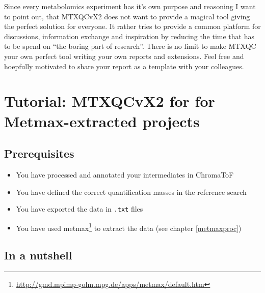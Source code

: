 \documentclass[]{book}
\providecommand{\tightlist}{%
  \setlength{\itemsep}{0pt}\setlength{\parskip}{0pt}}
\let\rmarkdownfootnote\footnote%
\def\footnote{\protect\rmarkdownfootnote}
\theoremstyle{definition}
\theoremstyle{definition}
\theoremstyle{definition}
\theoremstyle{remark}
\begin{document}
Since every metabolomics experiment has it's own purpose and reasoning I
want to point out, that MTXQCvX2 does not want to provide a magical tool
giving the perfect solution for everyone. It rather tries to provide a
common platform for discussions, information exchange and inspiration by
reducing the time that has to be spend on ``the boring part of
research''. There is no limit to make MTXQC your own perfect tool
writing your own reports and extensions. Feel free and hoepfully
motivated to share your report as a template with your colleagues.

\chapter{Tutorial: MTXQCvX2 for for Metmax-extracted
projects}\label{metmax}

\section{Prerequisites}\label{prerequisites-1}

\begin{itemize}
\tightlist
\item
  You have processed and annotated your intermediates in ChromaToF
\item
  You have defined the correct quantification masses in the reference
  search
\item
  You have exported the data in \texttt{.txt} files
\item
  You have used metmax\footnote{\url{http://gmd.mpimp-golm.mpg.de/apps/metmax/default.htm}}
  to extract the data (see chapter \ref{metmaxproc})
\end{itemize}

\section{In a nutshell}\label{in-a-nutshell}
\end{document}
